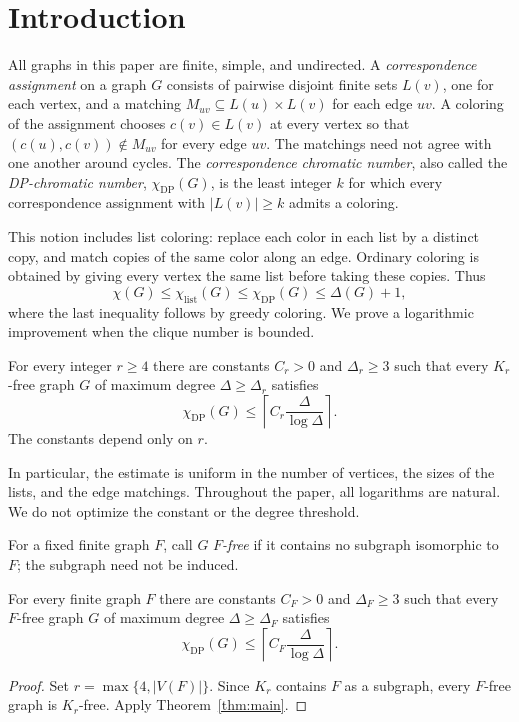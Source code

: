 \section{Introduction}\label{sec:introduction}

All graphs in this paper are finite, simple, and undirected. A
\emph{correspondence assignment} on a graph $G$ consists of pairwise
disjoint finite sets $L(v)$, one for each vertex, and a matching
$M_{uv}\subseteq L(u)\times L(v)$ for each edge $uv$. A coloring of the
assignment chooses $c(v)\in L(v)$ at every vertex so that
$(c(u),c(v))\notin M_{uv}$ for every edge $uv$. The matchings need not
agree with one another around cycles. The \emph{correspondence chromatic
number}, also called the \emph{DP-chromatic number}, $\chi_{\mathrm{DP}}(G)$,
is the least integer $k$ for which every correspondence assignment with
$|L(v)|\ge k$ admits a coloring.

This notion includes list coloring: replace each color in each list by
a distinct copy, and match copies of the same color along an edge.
Ordinary coloring is obtained by giving every vertex the same list
before taking these copies. Thus
\[
 \chi(G)\le \chi_{\mathrm{list}}(G)\le\chi_{\mathrm{DP}}(G)
 \le \Delta(G)+1,
\]
where the last inequality follows by greedy coloring. We prove a
logarithmic improvement when the clique number is bounded.

\begin{theorem}\label{thm:main}
For every integer $r\ge4$ there are constants $C_r>0$ and $\Delta_r\ge3$
such that every $K_r$-free graph $G$ of maximum degree
$\Delta\ge\Delta_r$ satisfies
\[
 \chi_{\mathrm{DP}}(G)
 \le \left\lceil C_r\frac{\Delta}{\log\Delta}\right\rceil.
\]
The constants depend only on $r$.
\end{theorem}

In particular, the estimate is uniform in the number of vertices,
the sizes of the lists, and the edge matchings. Throughout the paper,
all logarithms are natural. We do not optimize the constant or the
degree threshold.

For a fixed finite graph $F$, call $G$ \emph{$F$-free} if it contains no
subgraph isomorphic to $F$; the subgraph need not be induced.

\begin{corollary}\label{cor:forbidden}
For every finite graph $F$ there are constants $C_F>0$ and
$\Delta_F\ge3$ such that every $F$-free graph $G$ of maximum degree
$\Delta\ge\Delta_F$ satisfies
\[
 \chi_{\mathrm{DP}}(G)
 \le \left\lceil C_F\frac{\Delta}{\log\Delta}\right\rceil.
\]
\end{corollary}
\begin{proof}
Set $r=\max\{4,|V(F)|\}$. Since $K_r$ contains $F$ as a subgraph,
every $F$-free graph is $K_r$-free. Apply Theorem~\ref{thm:main}.
\end{proof}

